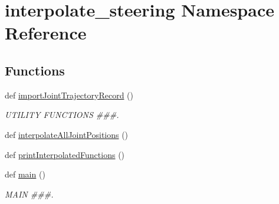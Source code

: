 \hypertarget{namespaceinterpolate__steering}{}\section{interpolate\+\_\+steering Namespace Reference}
\label{namespaceinterpolate__steering}
\subsection*{Functions}
\begin{DoxyCompactItemize}
\item 
def \mbox{\hyperlink{namespaceinterpolate__steering_a879e5de92db913e5d97859cab0e79ec3}{import\+Joint\+Trajectory\+Record}} ()
\begin{DoxyCompactList}\small\item\em U\+T\+I\+L\+I\+TY F\+U\+N\+C\+T\+I\+O\+NS \#\#\#. \end{DoxyCompactList}\item 
def \mbox{\hyperlink{namespaceinterpolate__steering_a661a2a86f4373dba14d9366cb38e6c89}{interpolate\+All\+Joint\+Positions}} ()
\item 
def \mbox{\hyperlink{namespaceinterpolate__steering_ae0e50c83e28f445fd70db3086ac48765}{print\+Interpolated\+Functions}} ()
\item 
def \mbox{\hyperlink{namespaceinterpolate__steering_afff43da3b2af12aba2e835642ec1c148}{main}} ()
\begin{DoxyCompactList}\small\item\em M\+A\+IN \#\#\#. \end{DoxyCompactList}\end{DoxyCompactItemize}
